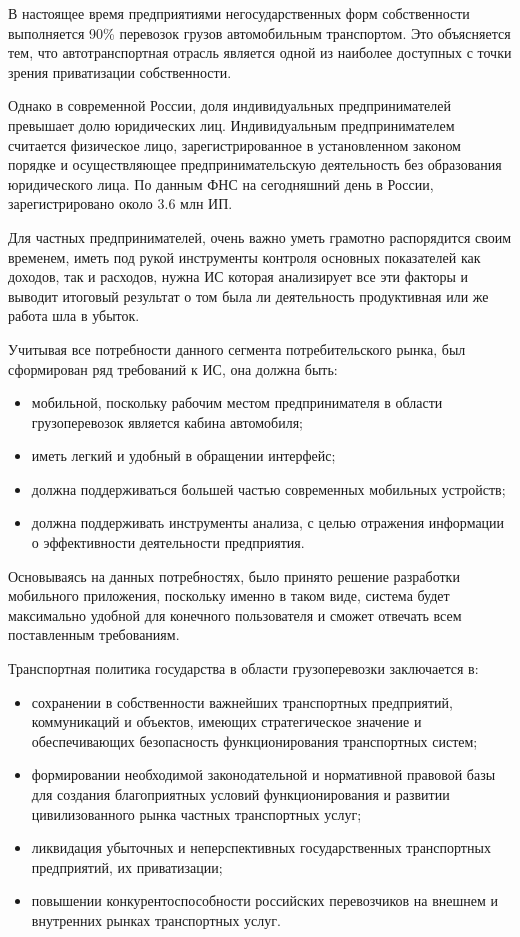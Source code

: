 В настоящее время предприятиями негосударственных форм собственности выполняется
90\% перевозок грузов автомобильным транспортом. Это объясняется тем, что
автотранспортная отрасль является одной из наиболее доступных с точки зрения
приватизации собственности.

Однако в современной России, доля индивидуальных предпринимателей превышает долю
юридических лиц.
Индивидуальным предпринимателем считается физическое лицо, зарегистрированное в
установленном законом порядке и осуществляющее предпринимательскую деятельность
без образования юридического лица. По данным ФНС на сегодняшний день в России,
зарегистрировано около 3.6 млн ИП.

Для частных предпринимателей, очень важно уметь грамотно распорядится своим
временем, иметь под рукой инструменты контроля основных показателей как доходов,
так и расходов, нужна ИС которая анализирует все эти факторы и выводит итоговый
результат о том была ли деятельность продуктивная или же работа шла в убыток.

Учитывая все потребности данного сегмента потребительского рынка, был
сформирован ряд требований к ИС, она должна быть:
\begin{itemize}
    \item мобильной, поскольку рабочим местом предпринимателя в области
		грузоперевозок является кабина автомобиля;
    \item иметь легкий и удобный в обращении интерфейс;
    \item должна поддерживаться большей частью современных мобильных устройств;
    \item должна поддерживать инструменты анализа, с целью отражения информации
		о эффективности деятельности предприятия.
\end{itemize}

Основываясь на данных потребностях, было принято решение разработки мобильного
приложения, поскольку именно в таком виде, система будет максимально удобной для
конечного пользователя и сможет отвечать всем поставленным требованиям.

Транспортная политика государства в области грузоперевозки заключается в:
\begin{itemize}
    \item сохранении в собственности важнейших транспортных предприятий,
		коммуникаций и объектов, имеющих стратегическое значение и
		обеспечивающих безопасность функционирования транспортных систем;
	\item формировании необходимой законодательной и нормативной правовой базы
		для создания благоприятных условий функционирования и развитии
		цивилизованного рынка частных транспортных услуг;
	\item ликвидация убыточных и неперспективных государственных транспортных
		предприятий, их приватизации;
	\item повышении конкурентоспособности российских перевозчиков на внешнем и
		внутренних рынках транспортных услуг.
\end{itemize}

